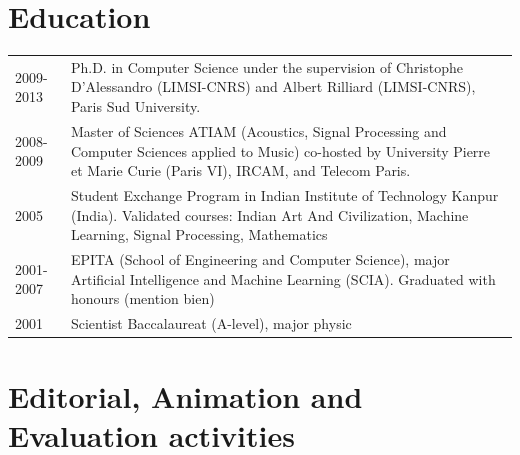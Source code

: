 \documentclass[a4paper,12pt]{article}
\begin{document}


\section{Education}
\begin{tabularx}{\linewidth}{@{}l X@{}}	
2009-2013 & Ph.D. in Computer Science under the supervision of Christophe D’Alessandro (LIMSI-CNRS) and Albert Rilliard (LIMSI-CNRS), Paris Sud University.\\
2008-2009 & Master of Sciences ATIAM (Acoustics, Signal Processing and Computer Sciences applied to Music) co-hosted by University Pierre et Marie Curie (Paris VI), IRCAM, and Telecom Paris.\\
2005 & Student Exchange Program in Indian Institute of Technology Kanpur (India). Validated courses: Indian Art And Civilization, Machine Learning, Signal Processing, Mathematics\\
2001-2007 & EPITA (School of Engineering and Computer Science), major Artificial Intelligence and Machine Learning (SCIA). Graduated with honours (mention bien)\\
2001 & Scientist Baccalaureat (A-level), major physic\\
\end{tabularx}



\section{Editorial, Animation and Evaluation activities}
\end{document}
